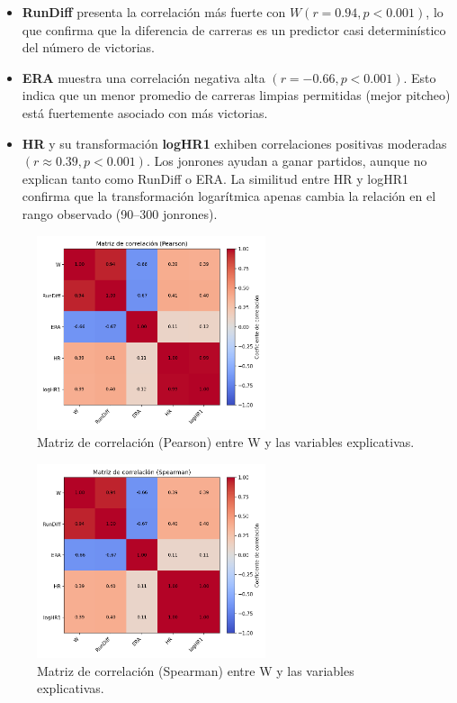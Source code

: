 \documentclass[10pt]{article}
\begin{document}
\begin{itemize}
    \item \textbf{RunDiff} presenta la correlación más fuerte con $W (r = 0.94, p < 0.001)$, lo que confirma que la diferencia de carreras es un predictor casi determinístico del número de victorias.
    \item \textbf{ERA} muestra una correlación negativa alta $(r = -0.66, p < 0.001)$. Esto indica que un menor promedio de carreras limpias permitidas (mejor pitcheo) está fuertemente asociado con más victorias.
    \item \textbf{HR} y su transformación \textbf{logHR1} exhiben correlaciones positivas moderadas $(r \approx 0.39, p < 0.001)$. Los jonrones ayudan a ganar partidos, aunque no explican tanto como RunDiff o ERA. La similitud entre HR y logHR1 confirma que la transformación logarítmica apenas cambia la relación en el rango observado (90--300 jonrones).
\end{itemize}

\begin{figure}[H]
    \centering
    \includegraphics[width=0.6\textwidth]{../plots/heatmap_corr_pearson.png}
    \caption{Matriz de correlación (Pearson) entre W y las variables explicativas.}
    \label{fig:heatmap_pearson}
\end{figure}

\begin{figure}[H]
    \centering
    \includegraphics[width=0.6\textwidth]{../plots/heatmap_corr_spearman.png}
    \caption{Matriz de correlación (Spearman) entre W y las variables explicativas.}
    \label{fig:heatmap_spearman}
\end{figure}
\end{document}
